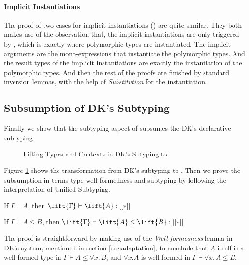 \paragraph{Implicit Instantiations}

The proof of two cases for implicit instantiations ()
are quite similar. They both makes use of the observation that, the implicit
instantiations are only triggered by , which is exactly where
polymorphic types are instantiated. The implicit arguments are the
mono-expressions that instantiate the polymorphic types. And the result types of the
implicit instantiations are exactly the instantiation of the polymorphic types.
And then the rest of the proofs are finished by standard inversion lemmas,
with the help of \emph{Substitution} for the instantiation.

\subsection{Subsumption of DK's Subtyping}

Finally we show that the subtyping aspect of \name subsumes the DK's declarative
subtyping\cite{DunfieldJoshua2013Caeb}.

\begin{figure}
    \caption{Lifting Types and Contexts in DK's Sutyping to \name}
    \label{fig:lift}
\end{figure}

Figure \ref{fig:lift} shows the transformation from DK's subtyping to \name.
Then we prove the subsumption in terms type well-formedness and subtyping
by following the interpretation of Unified Subtyping.

\begin{theorem}
    If $\Gamma \vdash A$, then $\lift{\Gamma} \vdash \lift{A} : [[*]]$
\end{theorem}

\begin{theorem}
    If $\Gamma \vdash A \le B$, then $\lift{\Gamma} \vdash \lift{A} \le \lift{B} : [[*]]$
\end{theorem}

The proof is straightforward by making use of the \emph{Well-formedness} lemma
in DK's system, mentioned in section \ref{sec:adaptation}, to conclude that
$A$ itself is a well-formed type in $\Gamma \vdash A \le \forall x.\, B$, and
$\forall x. A$ is well-formed in $\Gamma \vdash \forall x. \, A \le B$.
